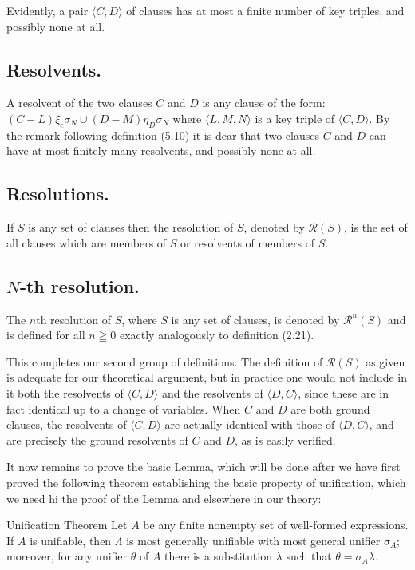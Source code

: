 \documentclass[8pt]{extarticle}
\begin{document}
Evidently, a pair $\langle C, D\rangle$ of clauses has at most a finite number of key triples, and possibly none at all.

\subsection{Resolvents.}
A resolvent of the two clauses $C$ and $D$ is any clause of the
form: $(C - L)\xi_c\sigma_N \cup (D - M)\eta_D\sigma_N$ where $\langle L, M, N\rangle$ is a key triple of $\langle C, D\rangle$.
By the remark following definition (5.10) it is dear that two clauses $C$ and $D$ can have at most finitely many resolvents, and possibly none at all.

\subsection{Resolutions.}
If $S$ is any set of clauses then the resolution of $S$, denoted
by $\mathscr{R}(S)$, is the set of all clauses which are members of $S$ or resolvents of members of $S$.

\subsection{$N$-th resolution.}
The $n$\-th resolution of $S$, where $S$ is any set of clauses,
is denoted by $\mathscr{R}^n(S)$ and is defined for all $n \geqq 0$ exactly analogously to definition (2.21).

This completes our second group of definitions. The definition of $\mathscr{R}(S)$ as given is adequate for our theoretical argument, but in practice one would not include in it both the resolvents of $\langle C, D\rangle$ and the resolvents of $\langle D, C\rangle$, since these are in fact identical up to a change of variables. When $C$ and $D$ are both ground clauses, the resolvents of $\langle C, D\rangle$ are actually identical with those of $\langle D, C\rangle$, and are precisely the ground resolvents of $C$ and $D$, as is easily verified.

It now remains to prove the basic Lemma, which will be done after we have
first proved the following theorem establishing the basic property of unification, which we need hi the proof of the Lemma and elsewhere in our theory: 


\begin{unificationTheorem}{Unification Theorem}\label{unificationTheorem}
Let $A$ be any finite nonempty set of well-formed expressions. If $A$ is unifiable, then $\Lambda$ is most generally unifiable with most general
unifier $\sigma_A$; moreover, for any unifier $\theta$ of $A$ there is a substitution $\lambda$ such that
$\theta = \sigma_A\lambda$.
\end{unificationTheorem}
\end{document}
